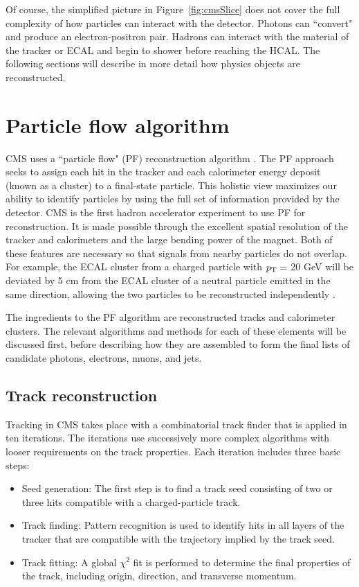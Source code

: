 Of course, the simplified picture in Figure~\ref{fig:cmsSlice} does not cover the full complexity of how particles can interact with the detector. Photons can ``convert" and produce an electron-positron pair. Hadrons can interact with the material of the tracker or ECAL and begin to shower before reaching the HCAL. The following sections will describe in more detail how physics objects are reconstructed. 


\section{Particle flow algorithm}
\label{sec:ParticleFlow}
CMS uses a ``particle flow" (PF) reconstruction algorithm \cite{ParticleFlow}. The PF approach seeks to assign each hit in the tracker and each calorimeter energy deposit (known as a cluster) to a final-state particle. This holistic view maximizes our ability to identify particles by using the full set of information provided by the detector. CMS is the first hadron accelerator experiment to use PF for reconstruction. It is made possible through the excellent spatial resolution of the tracker and calorimeters and the large bending power of the magnet. Both of these features are necessary so that signals from nearby particles do not overlap. For example, the ECAL cluster from a charged particle with $p_{\mathrm{T}} =$ 20 GeV will be deviated by 5 cm from the ECAL cluster of a neutral particle emitted in the same direction, allowing the two particles to be reconstructed independently \cite{ParticleFlow}.

The ingredients to the PF algorithm are reconstructed tracks and calorimeter clusters. The relevant algorithms and methods for each of these elements will be discussed first, before describing how they are assembled to form the final lists of candidate photons, electrons, muons, and jets. 

\subsection{Track reconstruction}
\label{sec:trackReco}
Tracking in CMS takes place with a combinatorial track finder that is applied in ten iterations. The iterations use successively more complex algorithms with looser requirements on the track properties. Each iteration includes three basic steps:
\begin{itemize}[leftmargin=*]
\item Seed generation: The first step is to find a track seed consisting of two or three hits compatible with a charged-particle track.
\item Track finding: Pattern recognition is used to identify hits in all layers of the tracker that are compatible with the trajectory implied by the track seed. 
\item Track fitting: A global $\chi^2$ fit is performed to determine the final properties of the track, including origin, direction, and transverse momentum. 
\end{itemize}

